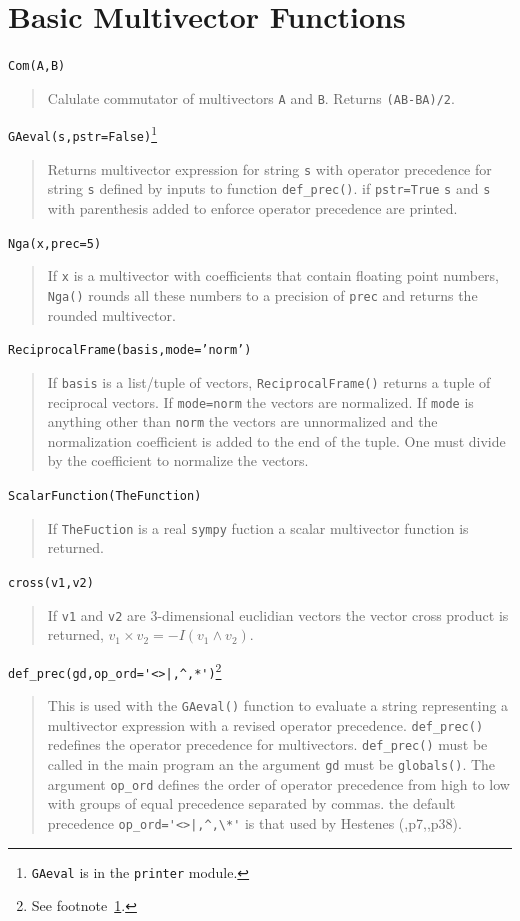\documentclass[12pt,twoside,openright]{memoir}
\newcommand{\lp}{\left (}
\newcommand{\rp}{\right )}
\newcommand{\W}{\wedge}
\newcommand{\paren}[1]{\lp {#1} \rp}
\newcommand{\T}[1]{\texttt{#1}}
\begin{document}
\section{Basic Multivector Functions}

\T{Com(A,B)}
\begin{quote}
   Calulate commutator of multivectors \T{A} and \T{B}.  Returns \T{(AB-BA)/2}.
\end{quote}
\T{GAeval(s,pstr=False)}\footnote{\T{GAeval} is in the \T{printer} module.\label{fn_6}}
\begin{quote}
   Returns multivector expression for string \T{s} with operator precedence for
   string \T{s} defined by inputs to function \T{def\_prec()}.  if \T{pstr=True}
   \T{s} and \T{s} with parenthesis added to enforce operator precedence are printed.
\end{quote}
\T{Nga(x,prec=5)}
\begin{quote}
   If \T{x} is a multivector with coefficients that contain floating point numbers, \T{Nga()}
   rounds all these numbers to a precision of \T{prec} and returns the rounded multivector.
\end{quote}
\T{ReciprocalFrame(basis,mode='norm')}
\begin{quote}
   If \T{basis} is a list/tuple of vectors, \T{ReciprocalFrame()} returns a tuple of reciprocal
   vectors.  If \T{mode=norm} the vectors are normalized.  If \T{mode} is anything other than
   \T{norm} the vectors are unnormalized and the normalization coefficient is added to the
   end of the tuple.  One must divide by the coefficient to normalize the vectors.
\end{quote}
\T{ScalarFunction(TheFunction)}
\begin{quote}
   If \T{TheFuction} is a real \T{sympy} fuction a scalar multivector function is returned.
\end{quote}
\T{cross(v1,v2)}
\begin{quote}
   If \T{v1} and \T{v2} are 3-dimensional euclidian vectors the vector cross product is
   returned, $v_{1}\times v_{2} = -I\paren{v_{1}\W v_{2}}$.
\end{quote}
\lstinline$def_prec(gd,op_ord='<>|,^,*')$\footnote{See footnote~\ref{fn_6}.}
\begin{quote}
   This is used with the \T{GAeval()} function to evaluate a string representing a multivector
   expression with a revised operator precedence.  \T{def\_prec()} redefines the operator
   precedence for multivectors. \T{def\_prec()} must be called in the main program an the
   argument \T{gd} must be \T{globals()}.  The argument \T{op\_ord} defines the order of operator
   precedence from high to low with groups of equal precedence separated by commas. the default
   precedence \lstinline$op_ord='<>|,^,\*'$ is that used by Hestenes (\cite{Hestenes},p7,\cite{Doran},p38).
\end{quote}
\end{document}
